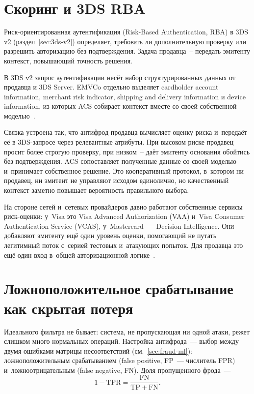 \section{Скоринг и 3DS RBA}\label{sec:fraud-3ds-rba}

Риск-ориентированная аутентификация (Risk-Based Authentication, RBA)
в 3DS v2 (раздел~\ref{sec:3ds-v2}) определяет, требовать ли дополнительную
проверку или разрешить авторизацию без подтверждения. Задача
продавца~-- передать эмитенту контекст, повышающий точность решения.

В 3DS v2 запрос аутентификации несёт набор структурированных данных
от продавца и 3DS Server.
EMVCo отдельно выделяет cardholder account information,
merchant risk indicator, shipping and delivery information
и device information, из которых ACS собирает контекст вместе
со своей собственной моделью~\cite{emvco-3ds,emvco-3ds-tech-features}.

Связка устроена так, что антифрод продавца вычисляет оценку риска
и~передаёт её в 3DS-запросе через релевантные атрибуты. При
высоком риске продавец просит более строгую проверку, при низком~--
даёт эмитенту основания обойтись без подтверждения. ACS
сопоставляет полученные данные со своей моделью и~принимает собственное решение.
Это кооперативный протокол, в~котором ни продавец, ни эмитент не
управляют исходом единолично, но качественный контекст заметно
повышает вероятность правильного выбора.

На стороне сетей и~сетевых провайдеров давно работают собственные
сервисы риск-оценки: у~Visa это Visa Advanced Authorization (VAA)
и~Visa Consumer Authentication Service (VCAS),
у~Mastercard~--- Decision Intelligence. Они добавляют эмитенту ещё один уровень оценки,
помогающий не путать легитимный поток с~серией тестовых и~атакующих
попыток. Для продавца это ещё один вход в~общей авторизационной
логике~\cite{visa-auth-management-2020,mc-decision-intelligence}.

\section{Ложноположительное срабатывание как скрытая потеря}\label{sec:fraud-false-positive}

Идеального фильтра не бывает: система, не пропускающая ни одной
атаки, режет слишком много нормальных операций. Настройка
антифрода~--- выбор между двумя ошибками матрицы несоответствий
(см.~\autoref{sec:fraud-ml}): ложноположительным срабатыванием
(false positive, FP~--- числитель FPR) и~ложноотрицательным
(false negative, FN). Доля пропущенного фрода~---
\[
  1 - \mathrm{TPR} = \frac{\mathrm{FN}}{\mathrm{TP} + \mathrm{FN}}.
\]

